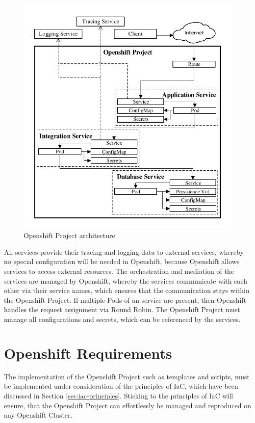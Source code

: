 \begin{figure}[htbp]
	\centering
	\includegraphics[scale=1]{images/esboc-design-openshift.pdf}
	\caption{Openshift Project architecture}
	\label{fig:esboc-design-openshift-project}
\end{figure} 

All services provide their tracing and logging data to external services, whereby no special configuration will be needed in Openshift, because Openshift allows services to access external resources. The orchestration and mediation of the services are managed by Openshift, whereby the services communicate with each other via their service names, which ensures that the communication stays within the Openshift Project. If multiple Pods of an service are present, then Openshift handles the request assignment via Round Robin. The Openshift Project must manage all configurations and secrets, which can be referenced by the services.

\section{Openshift Requirements}
\label{sec:esboc-requirements-oc}
The implementation of the Openshift Project such as templates and scripts, must be implemented under consideration of the principles of IaC, which have been discussed in Section \vref{sec:iac-principles}. Sticking to the principles of IaC will ensure, that the Openshift Project can effortlessly be managed and reproduced on any Openshift Cluster. \\

